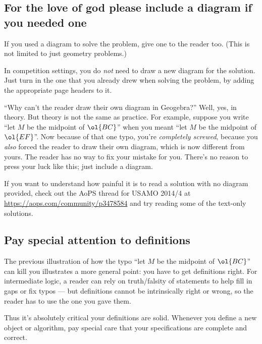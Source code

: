 \documentclass[11pt]{scrartcl}
\begin{document}
\subsection{For the love of god please include a diagram if you needed one}
If you used a diagram to solve the problem, give one to the reader too.
(This is not limited to just geometry problems.)

In competition settings, you do \emph{not} need to draw a new diagram for the solution.
Just turn in the one that you already drew when solving the problem,
by adding the appropriate page headers to it.

``Why can't the reader draw their own diagram in Geogebra?''
Well, yes, in theory. But theory is not the same as practice.
For example, suppose you write ``let $M$ be the midpoint of $\ol{BC}$''
when you meant ``let $M$ be the midpoint of $\ol{EF}$''.
Now because of that one typo, you're \emph{completely screwed},
because you \emph{also} forced the reader to draw their own diagram,
which is now different from yours.
The reader has no way to fix your mistake for you.
There's no reason to press your luck like this; just include a diagram.

If you want to understand how painful it is to read a solution with no diagram provided,
check out the AoPS thread for USAMO 2014/4 at \url{https://aops.com/community/p3478584}
and try reading some of the text-only solutions.

\subsection{Pay special attention to definitions}
The previous illustration of how the typo
``let $M$ be the midpoint of $\ol{BC}$'' can kill you
illustrates a more general point: you have to get definitions right.
For intermediate logic, a reader can rely on truth/falsity of statements
to help fill in gaps or fix typos --- but definitions cannot be
intrinsically right or wrong, so the reader has to use the one you gave them.

Thus it's absolutely critical your definitions are solid.
Whenever you define a new object or algorithm,
pay special care that your specifications are complete and correct.
\end{document}

